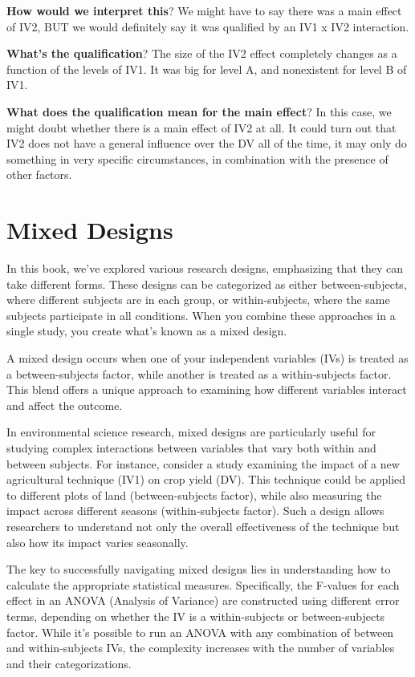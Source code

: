 \documentclass[
  letterpaper,
  DIV=11,
  numbers=noendperiod]{scrreprt}
\begin{document}
\textbf{How would we interpret this}? We might have to say there was a
main effect of IV2, BUT we would definitely say it was qualified by an
IV1 x IV2 interaction.

\textbf{What's the qualification}? The size of the IV2 effect completely
changes as a function of the levels of IV1. It was big for level A, and
nonexistent for level B of IV1.

\textbf{What does the qualification mean for the main effect}? In this
case, we might doubt whether there is a main effect of IV2 at all. It
could turn out that IV2 does not have a general influence over the DV
all of the time, it may only do something in very specific
circumstances, in combination with the presence of other factors.

\section{Mixed Designs}\label{mixed-designs}

In this book, we've explored various research designs, emphasizing that
they can take different forms. These designs can be categorized as
either between-subjects, where different subjects are in each group, or
within-subjects, where the same subjects participate in all conditions.
When you combine these approaches in a single study, you create what's
known as a mixed design.

A mixed design occurs when one of your independent variables (IVs) is
treated as a between-subjects factor, while another is treated as a
within-subjects factor. This blend offers a unique approach to examining
how different variables interact and affect the outcome.

In environmental science research, mixed designs are particularly useful
for studying complex interactions between variables that vary both
within and between subjects. For instance, consider a study examining
the impact of a new agricultural technique (IV1) on crop yield (DV).
This technique could be applied to different plots of land
(between-subjects factor), while also measuring the impact across
different seasons (within-subjects factor). Such a design allows
researchers to understand not only the overall effectiveness of the
technique but also how its impact varies seasonally.

The key to successfully navigating mixed designs lies in understanding
how to calculate the appropriate statistical measures. Specifically, the
F-values for each effect in an ANOVA (Analysis of Variance) are
constructed using different error terms, depending on whether the IV is
a within-subjects or between-subjects factor. While it's possible to run
an ANOVA with any combination of between and within-subjects IVs, the
complexity increases with the number of variables and their
categorizations.
\end{document}
